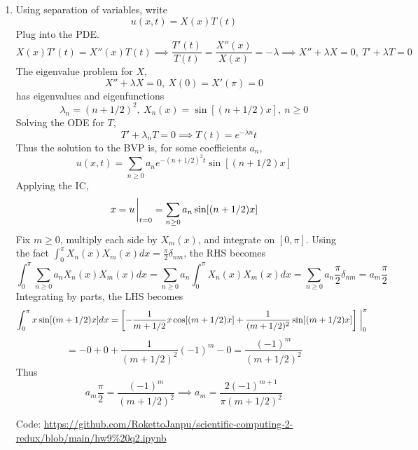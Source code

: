 \documentclass{article}
\newcommand{\sbr}[1]{\left[#1\right]}
\newcommand{\imp}{\implies}
\begin{document}
\begin{enumerate}
\item Using separation of variables, write
$$u(x,t) = X(x)T(t)$$
Plug into the PDE.
$$X(x)T'(t) = X''(x)T(t)
\imp \frac{T'(t)}{T(t)} = \frac{X''(x)}{X(x)} = -\lambda
\imp X''+\lambda X=0,~T'+\lambda T=0$$
The eigenvalue problem for $X$,
$$X''+\lambda X = 0, ~X(0) = X'(\pi) = 0$$
has eigenvalues and eigenfunctions
$$\lambda_n = (n+1/2)^2,
~X_n(x) = \sin[(n+1/2)x],
~n\ge 0$$
Solving the ODE for $T$,
$$\quad T'+\lambda_n T=0
\imp T(t) = e^{-\lambda n}t$$
Thus the solution to the BVP is, for some coefficients $a_n$,
$$u(x,t) = \sum_{n\ge0}a_ne^{-(n+1/2)^2t}\sin[(n+1/2)x]$$
Applying the IC,
$$x = u\eval_{t=0} = \sum_{n\ge0}a_n\sin[(n+1/2)x]$$
Fix $m\ge0$, multiply each side by $X_m(x)$, and integrate on $[0,\pi]$. Using the fact $\int_0^\pi X_n(x)X_m(x)dx=\frac\pi2\delta_{nm}$, the RHS becomes
$$\int_0^\pi \sum_{n\ge0}a_nX_n(x)X_m(x)dx = \sum_{n\ge0}a_n\int_0^\pi X_n(x)X_m(x)dx
= \sum_{n\ge0}a_n\frac\pi2 \delta_{nm}
= a_m\frac\pi2$$
Integrating by parts, the LHS becomes
$$\int_0^\pi x\sin[(m+1/2)x]dx = \sbr{-\frac{1}{m+1/2}x\cos[(m+1/2)x] + \frac{1}{(m+1/2)^2}\sin[(m+1/2)x]}\eval_0^\pi$$
$$= -0 + 0 + \frac{1}{(m+1/2)^2}(-1)^{m} - 0
= \frac{(-1)^{m}}{(m+1/2)^2}$$
Thus
$$a_m\frac\pi2 = \frac{(-1)^{m}}{(m+1/2)^2}
\imp a_m = \frac{2(-1)^{m+1}}{\pi(m+1/2)^2}$$

Code:
\url{https://github.com/RokettoJanpu/scientific-computing-2-redux/blob/main/hw9%20q2.ipynb}


\end{enumerate}
\end{document}
